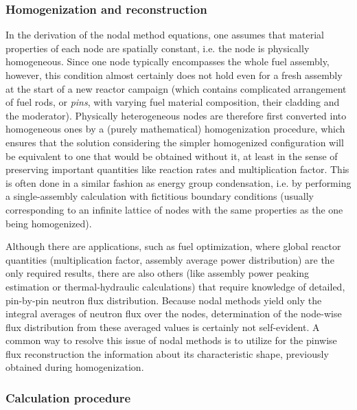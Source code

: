 \subsubsection{Homogenization and reconstruction}
In the derivation of the nodal method equations, one assumes that material properties of each node are spatially
constant, i.e. the node is physically homogeneous. Since one node typically encompasses the whole fuel assembly,
however, this condition almost certainly does not hold even for a fresh assembly at the start of a new reactor campaign
(which contains complicated arrangement of fuel rods, or \textit{pins}, with varying fuel material composition, their
cladding and the moderator). Physically heterogeneous nodes are therefore first converted into homogeneous ones by a
(purely mathematical) homogenization procedure, which ensures that the solution considering the simpler homogenized
configuration will be equivalent to one that would be obtained without it, at least in the sense of preserving important
quantities like reaction rates and multiplication factor. This is often done in a similar fashion as energy group
condensation, i.e. by performing a single-assembly calculation with fictitious boundary conditions (usually
corresponding to an infinite lattice of nodes with the same properties as the one being homogenized).

Although there are applications, such as fuel optimization, where global reactor quantities (multiplication factor,
assembly average power distribution) are the only required results, there are also others (like assembly power peaking
estimation or thermal-hydraulic calculations) that require knowledge of detailed, pin-by-pin neutron flux distribution.
Because nodal methods yield only the integral averages of neutron flux over the nodes, determination of the node-wise
flux distribution from these averaged values is certainly not self-evident. A common way to resolve this issue of nodal
methods is to utilize for the pinwise flux reconstruction the information about its characteristic shape, previously
obtained during homogenization.

\subsubsection{Calculation procedure}


